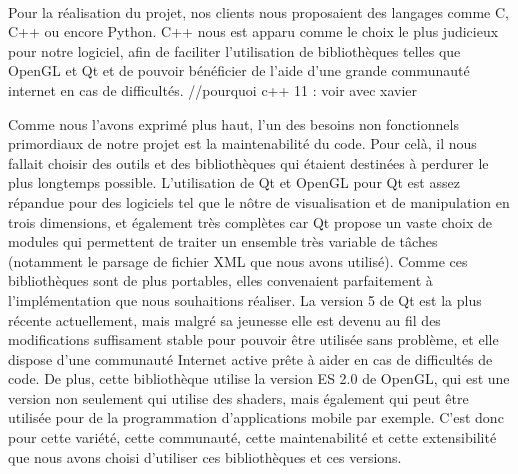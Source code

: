 \paragraph{}
        Pour la réalisation du projet, nos clients nous proposaient des langages comme C, C++ ou encore Python. C++ nous est apparu comme le choix le plus judicieux pour notre logiciel, afin de faciliter l'utilisation de bibliothèques telles que OpenGL et Qt et de pouvoir bénéficier de l'aide d'une grande communauté internet en cas de difficultés.
        //pourquoi c++ 11 : voir avec xavier

        Comme nous l'avons exprimé plus haut, l'un des besoins non fonctionnels primordiaux de notre projet est la maintenabilité du code. Pour celà, il nous fallait choisir des outils et des bibliothèques qui étaient destinées à perdurer le plus longtemps possible.
        L'utilisation de Qt et OpenGL pour Qt est assez répandue pour des logiciels tel que le nôtre de visualisation et de manipulation en trois dimensions, et également très complètes car Qt propose un vaste choix de modules qui permettent de traiter un ensemble très variable de tâches (notamment le parsage de fichier XML que nous avons utilisé). Comme ces bibliothèques sont de plus portables, elles convenaient parfaitement à l'implémentation que nous souhaitions réaliser.
        La version 5 de Qt est la plus récente actuellement, mais malgré sa jeunesse elle est devenu au fil des modifications suffisament stable pour pouvoir être utilisée sans problème, et elle dispose d'une communauté Internet active prête à aider en cas de difficultés de code. De plus, cette bibliothèque utilise la version ES 2.0 de OpenGL, qui est une version non seulement qui utilise des shaders, mais également qui peut être utilisée pour de la programmation d'applications mobile par exemple. C'est donc pour cette variété, cette communauté, cette maintenabilité et cette extensibilité que nous avons choisi d'utiliser ces bibliothèques et ces versions.
